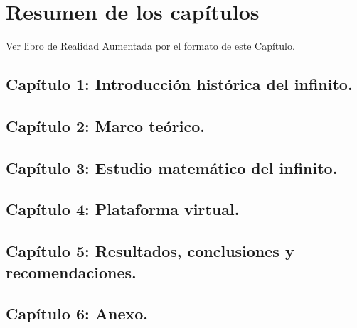 \chapter*{Resumen de los capítulos}
{\color{blue}Ver libro de Realidad Aumentada por el formato de este Capítulo.}

\section*{Capítulo 1: Introducción histórica del infinito.}

\section*{Capítulo 2: Marco teórico.}

\section*{Capítulo 3: Estudio matemático del infinito.}

\section*{Capítulo 4: Plataforma virtual.}

\section*{Capítulo 5: Resultados, conclusiones y recomendaciones.}

\section*{Capítulo 6: Anexo.}